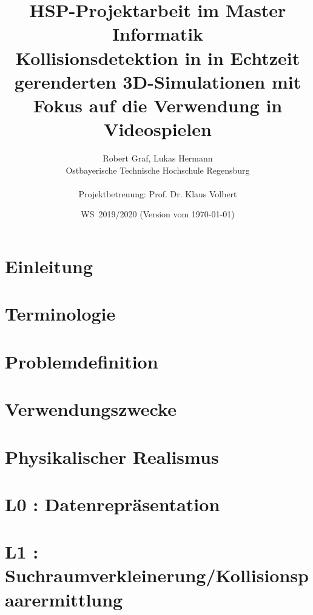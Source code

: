 \documentclass[11pt,twoside,a4paper]{article}
\begin{document}
\title{HSP-Projektarbeit im Master Informatik \\
\small Kollisionsdetektion in in Echtzeit gerenderten 3D-Simulationen mit Fokus auf die Verwendung in Videospielen}
\author{Robert Graf, Lukas Hermann\\
  Ostbayerische Technische Hochschule Regensburg\\
  \\
  Projektbetreuung: Prof. Dr. Klaus Volbert
}
  
\date{WS\, 2019/2020 (Version vom \today)}


\maketitle

\newpage
\tableofcontents



\section{Einleitung}


\section{Terminologie}


\section{Problemdefinition}


\section{Verwendungszwecke}


\section{Physikalischer Realismus}



\section{L0 : Datenrepräsentation}

\section{L1 : Suchraumverkleinerung/Kollisionspaarermittlung}

\end{document}
